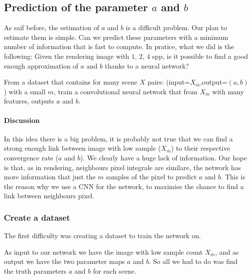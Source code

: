 \documentclass{classeENS}
\begin{document}
\subsection{Prediction of the parameter $a$ and $b$} \label{ab}

As saif before, the estimation of $a$ and $b$ is a difficult problem.
  Our plan to estimate them is simple. Can we predict 
  these parameters with a minimum number of information that is 
  fast to compute. 
  In pratice, what we did is the following:
  Given the rendering image with $1$, $2$, $4$ 
  spp, is it possible to find a good enough approximation 
  of $a$ and $b$ thanks to a neural network?

\par From a dataset that contains for many scene $X$ pairs: 
(input=$X_{\bar m}$,output=$(a,b)$) with a small $m$, train a 
convolutional neural network that from $X_{\bar m}$ with many features,
outputs $a$ and $b$.

\paragraph*{Discussion} In this idea there 
is a big problem, it is probably not true that we can find a 
strong enough link between image with low sample ($X_{\bar m}$) 
to their respective convergence rate ($a$ and $b$). We clearly have a 
huge lack of information. Our hope is that, as in rendering, neighbours 
pixel integrale are similare, the network has more information 
that just the $m$ samples of the pixel to predict $a$ and $b$. This 
is the reason why we use a CNN for the network, to maximise the chance
to find a link between neighbours pixel.

\subsubsection{Create a dataset}

\par The first difficulty was creating a dataset to train the network on. 

As input to our network we have 
the image with low sample count $X_{\bar m}$, and as output we have the 
two parameter maps $a$ and $b$. So all we had to do was find 
the truth parameters $a$ and $b$ for each scene.
\end{document}
